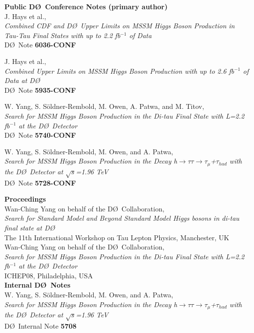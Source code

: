 \documentclass[12pt]{article}
\begin{document}
%
\textbf{\large Public D\O~Conference Notes (primary author) }\vspace{2mm}\\
J. Hays et al.,\\
\textsl{Combined CDF and D\O\ Upper Limits on MSSM Higgs Boson Production in Tau-Tau Final States with up to 2.2 fb$^{-1}$ of Data}\\
{\small{D\O~Note {\bf 6036-CONF}}}\vspace{2mm}

J. Hays et al.,\\
\textsl{
Combined Upper Limits on MSSM Higgs Boson Production with up to 2.6 fb$^{-1}$ of Data at D\O\ 
}\\
{\small{D\O~Note {\bf 5935-CONF}}}\vspace{2mm}

W. Yang, S. S\"oldner-Rembold, M. Owen, A. Patwa, and M. Titov,\\
\textsl{
Search for MSSM Higgs Boson Production in the Di-tau Final State with L=2.2 fb$^{-1}$ at the D\O~Detector }\\
{\small{D\O~Note {\bf 5740-CONF}}}\vspace{2mm}

W. Yang, S. S\"oldner-Rembold, M. Owen, and A. Patwa, \\
\textsl{
Search for MSSM Higgs Boson Production in the Decay h$\rightarrow\tau\tau\rightarrow\tau_{\mu}$+$\tau_{had}$ with the D\O~Detector at $\sqrt{s}$=1.96 TeV }\\
{\small{D\O~Note {\bf 5728-CONF}}}\vspace{4mm}

%
\textbf{\large Proceedings}\vspace{2mm}\\
Wan-Ching Yang on behalf of the D\O~Collaboration, \\
\textsl{
Search for Standard Model and Beyond Standard Model Higgs bosons in di-tau final state at D\O}\\
The 11th International Workshop on Tau Lepton Physics, Manchester, UK\\

Wan-Ching Yang on behalf of the D\O~Collaboration, \\
\textsl{
Search for MSSM Higgs Boson Production in the Di-tau Final State with L=2.2 fb$^{-1}$ at the D\O~Detector}\\
ICHEP08, Philadelphia, USA\\


%
\textbf{\large Internal D\O~Notes}\vspace{2mm}\\
W. Yang, S. S\"oldner-Rembold, M. Owen, and A. Patwa, \\
\textsl{
Search for MSSM Higgs Boson Production in the Decay h$\rightarrow\tau\tau\rightarrow\tau_{\mu}$+$\tau_{had}$ with the D\O~Detector at $\sqrt{s}$=1.96 TeV }\\
{\small{D\O~Internal Note {\bf 5708}}}\vspace{2mm}
\end{document}
